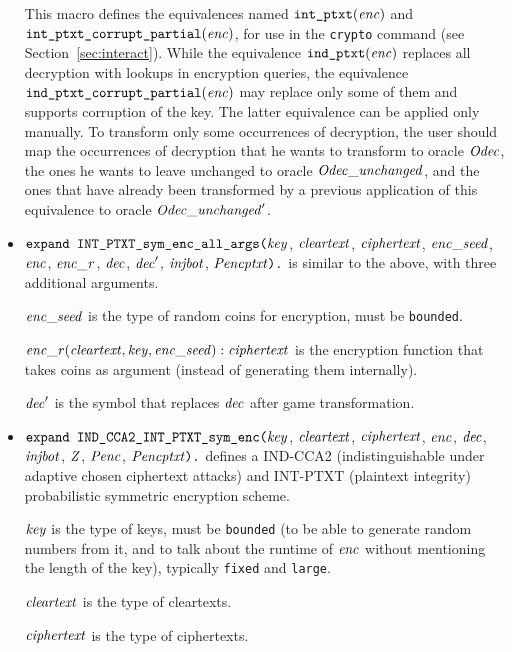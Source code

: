 \documentclass{article}
\begin{document}
\begin{itemize}
   This macro defines the equivalences named
   $\texttt{int\_ptxt}(\mathit{enc})$ and
   $\texttt{int\_ptxt\_corrupt\_partial}(\mathit{enc})$, for use in the
   \texttt{crypto} command (see Section~\ref{sec:interact}).  While
   the equivalence $\texttt{ind\_ptxt}(\mathit{enc})$ replaces all
   decryption with lookups in encryption queries, the equivalence
   $\texttt{ind\_ptxt\_corrupt\_partial}(\mathit{enc})$ may replace only some of them
   and supports corruption of the key. 
   The latter equivalence can be applied only manually.
   To transform only some occurrences of decryption, 
   the user should map the occurrences of decryption that he wants to
   transform to oracle $\mathit{Odec}$, the ones he wants to leave
   unchanged to oracle $\mathit{Odec\_unchanged}$, and the ones that have
   already been transformed by a previous application of this
   equivalence to oracle $\mathit{Odec\_unchanged}'$.

\item $\texttt{expand INT\_PTXT\_sym\_enc\_all\_args(}\mathit{key}$,
$  \mathit{cleartext}$, $\mathit{ciphertext}$, $\mathit{enc\_seed}$, $\mathit{enc}$, $\mathit{enc\_r}$,
$  \mathit{dec}$, $\mathit{dec}'$, $\mathit{injbot}$, $\mathit{Pencptxt}\texttt{).}$ is similar to the above,
  with three additional arguments. 

  $\mathit{enc\_seed}$ is the type of random coins for encryption, must be \texttt{bounded}.

  $\mathit{enc\_r}(\mathit{cleartext}, \mathit{key}, \mathit{enc\_seed}): \mathit{ciphertext}$ is the encryption function that takes coins as argument (instead of generating them internally).

  $\mathit{dec}'$ is the symbol that replaces $\mathit{dec}$ after game transformation.

\item $\texttt{expand IND\_CCA2\_INT\_PTXT\_sym\_enc(}\mathit{key}$,
$  \mathit{cleartext}$, $\mathit{ciphertext}$, $\mathit{enc}$,
$  \mathit{dec}$, $\mathit{injbot}$, $\mathit{Z}$, $\mathit{Penc}$, $\mathit{Pencptxt}\texttt{).}$ defines a
  IND-CCA2 (indistinguishable under adaptive chosen ciphertext attacks) and INT-PTXT (plaintext integrity)
  probabilistic symmetric encryption scheme.

   $\mathit{key}$ is the type of keys, must be \texttt{bounded} (to be able to generate random numbers from it, and to talk about the runtime of $\mathit{enc}$ without mentioning the length of the key), typically \texttt{fixed} and \texttt{large}.

   $\mathit{cleartext}$ is the type of cleartexts.

   $\mathit{ciphertext}$ is the type of ciphertexts.


\end{itemize}
\end{document}
